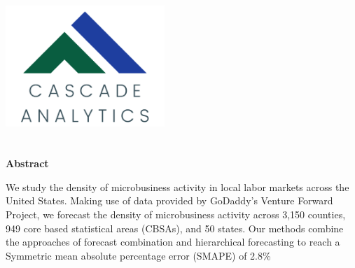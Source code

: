 \documentclass[
a4paper, %
12pt, %
]{CascadeAnalyticsWPS}
\begin{document}
	
	
	\thispagestyle{empty} %
	\begin{titlepage}
		\begin{center}
		\includegraphics[width =6cm]{company.png}\\ \vspace{5mm}	
		{\LARGE\sffamily\mdseries\reporttitle} \\ %
		\vspace{5mm}	
		{\normalsize{\reportauthors}} \\ %
		\vspace{3mm}
		{\textbf{\normalsize{Abstract}}} 
		\end{center}
		\footnotesize{We study the density of microbusiness activity in local labor markets across the United States. Making use of data provided by GoDaddy's Venture Forward Project, we forecast the density of microbusiness activity across 3,150 counties, 949 core based statistical areas (CBSAs), and 50 states. Our methods combine the approaches of forecast combination and hierarchical forecasting to reach a Symmetric mean absolute percentage error (SMAPE) of 2.8\%}
		\vfill\vfill\vfill %
		\centering
		{\large\reportdate\par} %
	\end{titlepage}	
	\newpage
	
	\tableofcontents
	\protect\thispagestyle{empty}
	\cleardoublepage
	
\end{document}
